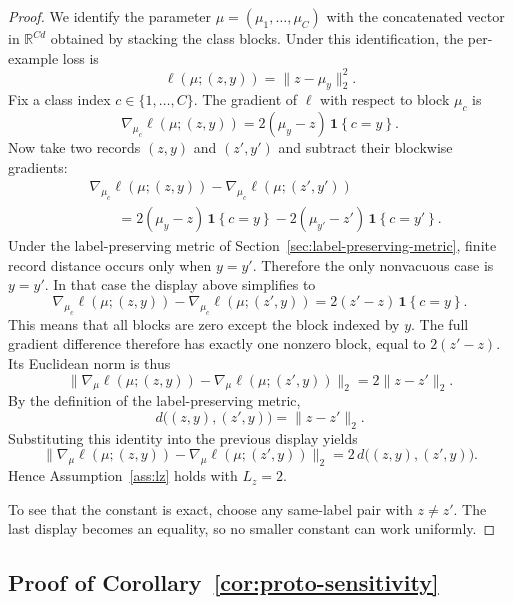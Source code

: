 \documentclass[11pt,a4paper]{report}
\theoremstyle{plain}
\theoremstyle{definition}
\theoremstyle{remark}
\newcommand{\ind}[1]{\mathbf{1}\!\left\{#1\right\}}
\begin{document}
\begin{proof}
We identify the parameter $\mu=(\mu_1,\dots,\mu_C)$ with the concatenated vector in $\mathbb{R}^{Cd}$ obtained by stacking the class blocks. Under this identification, the per-example loss is
\[
\ell(\mu;(z,y))=\|z-\mu_y\|_2^2.
\]
Fix a class index $c\in\{1,\dots,C\}$. The gradient of $\ell$ with respect to block $\mu_c$ is
\[
\nabla_{\mu_c}\ell(\mu;(z,y))
=
2(\mu_y-z)\,\ind{c=y}.
\]
Now take two records $(z,y)$ and $(z',y')$ and subtract their blockwise gradients:
\[
\begin{aligned}
&\nabla_{\mu_c}\ell(\mu;(z,y))
-
\nabla_{\mu_c}\ell(\mu;(z',y')) \\
&\qquad =
2(\mu_y-z)\,\ind{c=y}
-
2(\mu_{y'}-z')\,\ind{c=y'}.
\end{aligned}
\]
Under the label-preserving metric of Section~\ref{sec:label-preserving-metric}, finite record distance occurs only when $y=y'$. Therefore the only nonvacuous case is $y=y'$. In that case the display above simplifies to
\[
\nabla_{\mu_c}\ell(\mu;(z,y))-
\nabla_{\mu_c}\ell(\mu;(z',y))
=
2(z'-z)\,\ind{c=y}.
\]
This means that all blocks are zero except the block indexed by $y$. The full gradient difference therefore has exactly one nonzero block, equal to $2(z'-z)$. Its Euclidean norm is thus
\[
\|\nabla_\mu \ell(\mu;(z,y))-
\nabla_\mu \ell(\mu;(z',y))\|_2
=
2\|z-z'\|_2.
\]
By the definition of the label-preserving metric,
\[
d\big((z,y),(z',y)\big)=\|z-z'\|_2.
\]
Substituting this identity into the previous display yields
\[
\|\nabla_\mu \ell(\mu;(z,y))-
\nabla_\mu \ell(\mu;(z',y))\|_2
=
2\,d\big((z,y),(z',y)\big).
\]
Hence Assumption~\ref{ass:lz} holds with $L_z=2$.

To see that the constant is exact, choose any same-label pair with $z\neq z'$. The last display becomes an equality, so no smaller constant can work uniformly.
\end{proof}

\subsection{Proof of Corollary~\ref{cor:proto-sensitivity}}
\end{document}
